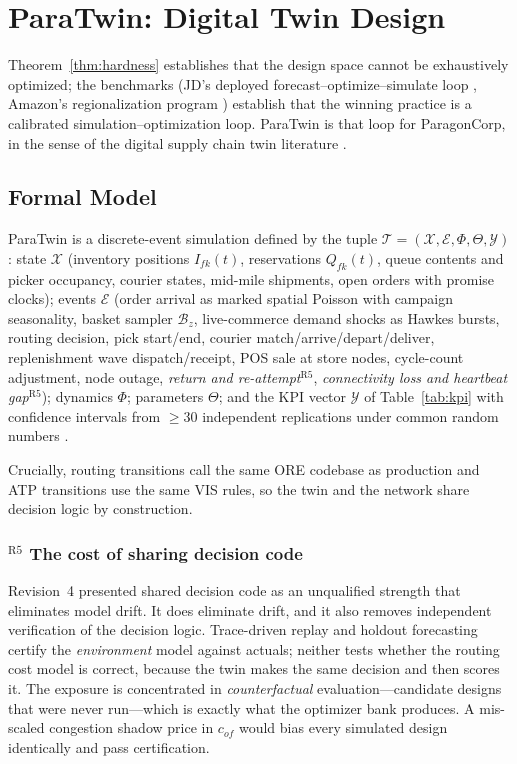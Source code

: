 \section{ParaTwin: Digital Twin Design}\label{sec:twin}

Theorem~\ref{thm:hardness} establishes that the design space cannot be exhaustively optimized; the benchmarks (JD's deployed forecast--optimize--simulate loop \cite{wang2025}, Amazon's regionalization program \cite{chandra2026}) establish that the winning practice is a calibrated simulation--optimization loop. ParaTwin is that loop for ParagonCorp, in the sense of the digital supply chain twin literature \cite{ivanov2021,le2024,snoeck2022}.

\subsection{Formal Model}
\begin{definition}[ParaTwin]
ParaTwin is a discrete-event simulation \cite{law2015} defined by the tuple $\mathcal{T}=(\mathcal{X},\mathcal{E},\Phi,\Theta,\mathcal{Y})$: state $\mathcal{X}$ (inventory positions $I_{fk}(t)$, reservations $Q_{fk}(t)$, queue contents and picker occupancy, courier states, mid-mile shipments, open orders with promise clocks); events $\mathcal{E}$ (order arrival as marked spatial Poisson with campaign seasonality, basket sampler $\mathcal{B}_z$, live-commerce demand shocks as Hawkes bursts, routing decision, pick start/end, courier match/arrive/depart/deliver, replenishment wave dispatch/receipt, POS sale at store nodes, cycle-count adjustment, node outage, \emph{return and re-attempt}$^{\mathrm{R5}}$, \emph{connectivity loss and heartbeat gap}$^{\mathrm{R5}}$); dynamics $\Phi$; parameters $\Theta$; and the KPI vector $\mathcal{Y}$ of Table~\ref{tab:kpi} with confidence intervals from $\ge30$ independent replications under common random numbers \cite{law2015}.
\end{definition}

Crucially, routing transitions call the same ORE codebase as production and ATP transitions use the same VIS rules, so the twin and the network share decision logic by construction.

\subsubsection*{$^{\mathrm{R5}}$ The cost of sharing decision code}
Revision~4 presented shared decision code as an unqualified strength that eliminates model drift. It does eliminate drift, and it also removes independent verification of the decision logic. Trace-driven replay and holdout forecasting certify the \emph{environment} model against actuals; neither tests whether the routing cost model is correct, because the twin makes the same decision and then scores it. The exposure is concentrated in \emph{counterfactual} evaluation---candidate designs that were never run---which is exactly what the optimizer bank produces. A mis-scaled congestion shadow price in $c_{of}$ would bias every simulated design identically and pass certification.

